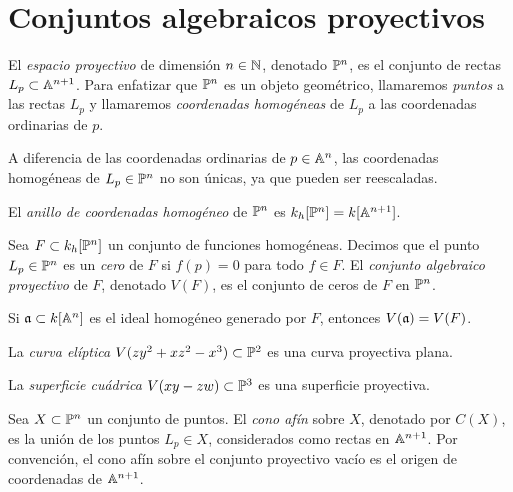 \section{Conjuntos algebraicos proyectivos}

\begin{definition}
El \textit{espacio proyectivo} de dimensión $n \in \N$, denotado $\P^n$, es el conjunto de rectas $L_p \subset \A^{n+1}$. Para enfatizar que $\P^n$ es un objeto geométrico, llamaremos \textit{puntos} a las rectas $L_p$ y llamaremos \textit{coordenadas homogéneas} de $L_p$ a las coordenadas ordinarias de $p$.
\end{definition}

\begin{remark}
A diferencia de las coordenadas ordinarias de $p \in \A^n$, las coordenadas homogéneas de $L_p \in \P^n$ no son únicas, ya que pueden ser reescaladas.
\end{remark}

\begin{definition}
El \textit{anillo de coordenadas homogéneo} de $\P^n$ es $k_h[\P^n] = k[\A^{n+1}]$.
\end{definition}

\begin{definition}
Sea $F \subset k_h[\P^n]$ un conjunto de funciones homogéneas. Decimos que el punto $L_p \in \P^n$ es un \textit{cero} de $F$ si $f(p) = 0$ para todo $f \in F$. El \textit{conjunto algebraico proyectivo} de $F$, denotado $V(F)$, es el conjunto de ceros de $F$ en $\P^n$.
\end{definition}

\begin{remark}
Si $\a \subset k[\A^n]$ es el ideal homogéneo generado por $F$, entonces $V(\a) = V(F)$.
\end{remark}

\begin{example}
La \textit{curva elíptica} $V(zy^2 + xz^2 - x^3) \subset \P^2$ es una curva proyectiva plana.
\end{example}

\begin{example}
La \textit{superficie cuádrica} $V(xy - zw) \subset \P^3$ es una superficie proyectiva.
\end{example}

\begin{definition}
Sea $X \subset \P^n$ un conjunto de puntos. El \textit{cono afín} sobre $X$, denotado por $C(X)$, es la unión de los puntos $L_p \in X$, considerados como rectas en $\A^{n+1}$. Por convención, el cono afín sobre el conjunto proyectivo vacío es el origen de coordenadas de $\A^{n+1}$.
\end{definition}

